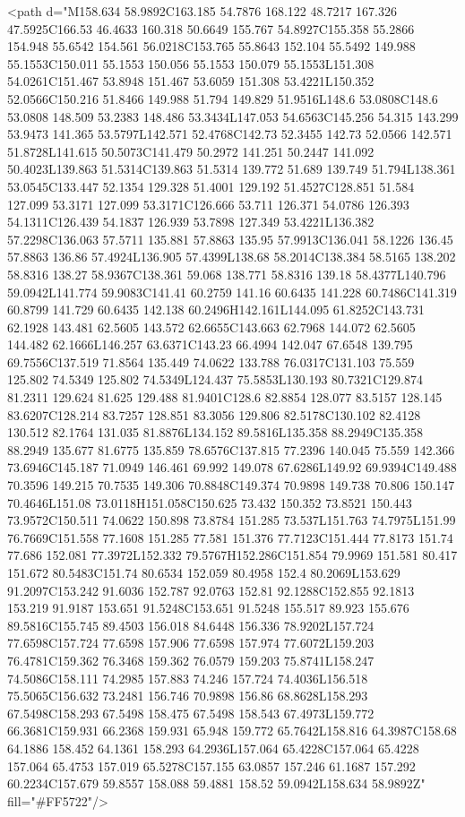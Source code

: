 <path d="M158.634 58.9892C163.185 54.7876 168.122 48.7217 167.326 47.5925C166.53 46.4633 160.318 50.6649 155.767 54.8927C155.358 55.2866 154.948 55.6542 154.561 56.0218C153.765 55.8643 152.104 55.5492 149.988 55.1553C150.011 55.1553 150.056 55.1553 150.079 55.1553L151.308 54.0261C151.467 53.8948 151.467 53.6059 151.308 53.4221L150.352 52.0566C150.216 51.8466 149.988 51.794 149.829 51.9516L148.6 53.0808C148.6 53.0808 148.509 53.2383 148.486 53.3434L147.053 54.6563C145.256 54.315 143.299 53.9473 141.365 53.5797L142.571 52.4768C142.73 52.3455 142.73 52.0566 142.571 51.8728L141.615 50.5073C141.479 50.2972 141.251 50.2447 141.092 50.4023L139.863 51.5314C139.863 51.5314 139.772 51.689 139.749 51.794L138.361 53.0545C133.447 52.1354 129.328 51.4001 129.192 51.4527C128.851 51.584 127.099 53.3171 127.099 53.3171C126.666 53.711 126.371 54.0786 126.393 54.1311C126.439 54.1837 126.939 53.7898 127.349 53.4221L136.382 57.2298C136.063 57.5711 135.881 57.8863 135.95 57.9913C136.041 58.1226 136.45 57.8863 136.86 57.4924L136.905 57.4399L138.68 58.2014C138.384 58.5165 138.202 58.8316 138.27 58.9367C138.361 59.068 138.771 58.8316 139.18 58.4377L140.796 59.0942L141.774 59.9083C141.41 60.2759 141.16 60.6435 141.228 60.7486C141.319 60.8799 141.729 60.6435 142.138 60.2496H142.161L144.095 61.8252C143.731 62.1928 143.481 62.5605 143.572 62.6655C143.663 62.7968 144.072 62.5605 144.482 62.1666L146.257 63.6371C143.23 66.4994 142.047 67.6548 139.795 69.7556C137.519 71.8564 135.449 74.0622 133.788 76.0317C131.103 75.559 125.802 74.5349 125.802 74.5349L124.437 75.5853L130.193 80.7321C129.874 81.2311 129.624 81.625 129.488 81.9401C128.6 82.8854 128.077 83.5157 128.145 83.6207C128.214 83.7257 128.851 83.3056 129.806 82.5178C130.102 82.4128 130.512 82.1764 131.035 81.8876L134.152 89.5816L135.358 88.2949C135.358 88.2949 135.677 81.6775 135.859 78.6576C137.815 77.2396 140.045 75.559 142.366 73.6946C145.187 71.0949 146.461 69.992 149.078 67.6286L149.92 69.9394C149.488 70.3596 149.215 70.7535 149.306 70.8848C149.374 70.9898 149.738 70.806 150.147 70.4646L151.08 73.0118H151.058C150.625 73.432 150.352 73.8521 150.443 73.9572C150.511 74.0622 150.898 73.8784 151.285 73.537L151.763 74.7975L151.99 76.7669C151.558 77.1608 151.285 77.581 151.376 77.7123C151.444 77.8173 151.74 77.686 152.081 77.3972L152.332 79.5767H152.286C151.854 79.9969 151.581 80.417 151.672 80.5483C151.74 80.6534 152.059 80.4958 152.4 80.2069L153.629 91.2097C153.242 91.6036 152.787 92.0763 152.81 92.1288C152.855 92.1813 153.219 91.9187 153.651 91.5248C153.651 91.5248 155.517 89.923 155.676 89.5816C155.745 89.4503 156.018 84.6448 156.336 78.9202L157.724 77.6598C157.724 77.6598 157.906 77.6598 157.974 77.6072L159.203 76.4781C159.362 76.3468 159.362 76.0579 159.203 75.8741L158.247 74.5086C158.111 74.2985 157.883 74.246 157.724 74.4036L156.518 75.5065C156.632 73.2481 156.746 70.9898 156.86 68.8628L158.293 67.5498C158.293 67.5498 158.475 67.5498 158.543 67.4973L159.772 66.3681C159.931 66.2368 159.931 65.948 159.772 65.7642L158.816 64.3987C158.68 64.1886 158.452 64.1361 158.293 64.2936L157.064 65.4228C157.064 65.4228 157.064 65.4753 157.019 65.5278C157.155 63.0857 157.246 61.1687 157.292 60.2234C157.679 59.8557 158.088 59.4881 158.52 59.0942L158.634 58.9892Z" fill="#FF5722"/>

